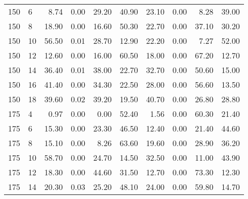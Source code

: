 \begin{table*}[h]
\begin{center}
\begin{tabular} {l l | r r r r | r r r r }
150  &             6   &  8.74   &            0.00             &               29.20  &  40.90  &  23.10  &            0.00             &               8.28   &  39.00  \\
150  &             8   &  18.90  &            0.00             &               16.60  &  50.30  &  22.70  &            0.00             &               37.10  &  30.20  \\
150  &             10  &  56.50  &            0.01             &               28.70  &  12.90  &  22.20  &            0.00             &               7.27   &  52.00  \\
150  &             12  &  12.60  &            0.00             &               16.00  &  60.50  &  18.00  &            0.00             &               67.20  &  12.70  \\
150  &             14  &  36.40  &            0.01             &               38.00  &  22.70  &  32.70  &            0.00             &               50.60  &  15.00  \\
150  &             16  &  41.40  &            0.00             &               34.30  &  22.50  &  28.00  &            0.00             &               56.60  &  13.50  \\
150  &             18  &  39.60  &            0.02             &               39.20  &  19.50  &  40.70  &            0.00             &               26.80  &  28.80  \\
175  &             4   &  0.97   &            0.00             &               0.00   &  52.40  &  1.56   &            0.00             &               60.30  &  21.40  \\
175  &             6   &  15.30  &            0.00             &               23.30  &  46.50  &  12.40  &            0.00             &               21.40  &  44.60  \\
175  &             8   &  15.10  &            0.00             &               8.26   &  63.60  &  19.60  &            0.00             &               28.90  &  36.20  \\
175  &             10  &  58.70  &            0.00             &               24.70  &  14.50  &  32.50  &            0.00             &               11.00  &  43.90  \\
175  &             12  &  18.30  &            0.00             &               44.60  &  31.50  &  12.70  &            0.00             &               73.30  &  12.30  \\
175  &             14  &  20.30  &            0.03             &               25.20  &  48.10  &  24.00  &            0.00             &               59.80  &  14.70  \\

\end{tabular}
\end{center}
\end{table*}

